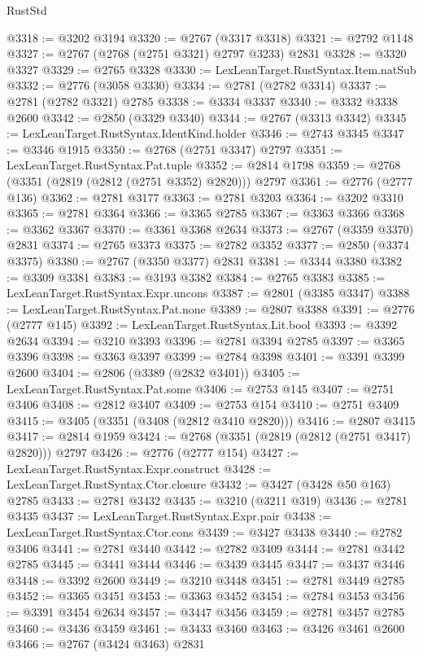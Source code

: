 \begin{lexlean}{RustStd}
\begin{coremodule}
@3318 := @3202 @3194
@3320 := @2767 (@3317 @3318)
@3321 := @2792 @1148
@3327 := @2767 (@2768 (@2751 @3321) @2797 @3233) @2831
@3328 := @3320 @3327
@3329 := @2765 @3328
@3330 := LexLeanTarget.RustSyntax.Item.natSub
@3332 := @2776 (@3058 @3330)
@3334 := @2781 (@2782 @3314)
@3337 := @2781 (@2782 @3321) @2785
@3338 := @3334 @3337
@3340 := @3332 @3338 @2600
@3342 := @2850 (@3329 @3340)
@3344 := @2767 (@3313 @3342)
@3345 := LexLeanTarget.RustSyntax.IdentKind.holder
@3346 := @2743 @3345
@3347 := @3346 @1915
@3350 := @2768 (@2751 @3347) @2797
@3351 := LexLeanTarget.RustSyntax.Pat.tuple
@3352 := @2814 @1798
@3359 := @2768 (@3351 (@2819 (@2812 (@2751 @3352) @2820))) @2797
@3361 := @2776 (@2777 @136)
@3362 := @2781 @3177
@3363 := @2781 @3203
@3364 := @3202 @3310
@3365 := @2781 @3364
@3366 := @3365 @2785
@3367 := @3363 @3366
@3368 := @3362 @3367
@3370 := @3361 @3368 @2634
@3373 := @2767 (@3359 @3370) @2831
@3374 := @2765 @3373
@3375 := @2782 @3352
@3377 := @2850 (@3374 @3375)
@3380 := @2767 (@3350 @3377) @2831
@3381 := @3344 @3380
@3382 := @3309 @3381
@3383 := @3193 @3382
@3384 := @2765 @3383
@3385 := LexLeanTarget.RustSyntax.Expr.uncons
@3387 := @2801 (@3385 @3347)
@3388 := LexLeanTarget.RustSyntax.Pat.none
@3389 := @2807 @3388
@3391 := @2776 (@2777 @145)
@3392 := LexLeanTarget.RustSyntax.Lit.bool
@3393 := @3392 @2634
@3394 := @3210 @3393
@3396 := @2781 @3394 @2785
@3397 := @3365 @3396
@3398 := @3363 @3397
@3399 := @2784 @3398
@3401 := @3391 @3399 @2600
@3404 := @2806 (@3389 (@2832 @3401))
@3405 := LexLeanTarget.RustSyntax.Pat.some
@3406 := @2753 @145
@3407 := @2751 @3406
@3408 := @2812 @3407
@3409 := @2753 @154
@3410 := @2751 @3409
@3415 := @3405 (@3351 (@3408 (@2812 @3410 @2820)))
@3416 := @2807 @3415
@3417 := @2814 @1959
@3424 := @2768 (@3351 (@2819 (@2812 (@2751 @3417) @2820))) @2797
@3426 := @2776 (@2777 @154)
@3427 := LexLeanTarget.RustSyntax.Expr.construct
@3428 := LexLeanTarget.RustSyntax.Ctor.closure
@3432 := @3427 (@3428 @50 @163) @2785
@3433 := @2781 @3432
@3435 := @3210 (@3211 @319)
@3436 := @2781 @3435
@3437 := LexLeanTarget.RustSyntax.Expr.pair
@3438 := LexLeanTarget.RustSyntax.Ctor.cons
@3439 := @3427 @3438
@3440 := @2782 @3406
@3441 := @2781 @3440
@3442 := @2782 @3409
@3444 := @2781 @3442 @2785
@3445 := @3441 @3444
@3446 := @3439 @3445
@3447 := @3437 @3446
@3448 := @3392 @2600
@3449 := @3210 @3448
@3451 := @2781 @3449 @2785
@3452 := @3365 @3451
@3453 := @3363 @3452
@3454 := @2784 @3453
@3456 := @3391 @3454 @2634
@3457 := @3447 @3456
@3459 := @2781 @3457 @2785
@3460 := @3436 @3459
@3461 := @3433 @3460
@3463 := @3426 @3461 @2600
@3466 := @2767 (@3424 @3463) @2831

\end{coremodule}
\end{lexlean}
